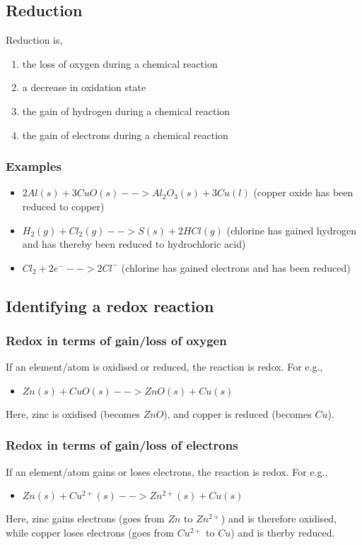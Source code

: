 \documentclass[11pt]{article}
\begin{document}
\subsection{Reduction}
\label{sec:org8f3e18a}
Reduction is,
\begin{enumerate}
\item the loss of oxygen during a chemical reaction
\item a decrease in oxidation state
\item the gain of hydrogen during a chemical reaction
\item the gain of electrons during a chemical reaction
\end{enumerate}
\subsubsection{Examples}
\label{sec:orgc301ad1}
\begin{itemize}
\item \(2Al(s) + 3CuO(s) --> Al_2O_3(s) + 3Cu(l)\) (copper oxide has been reduced to copper)
\item \(H_2(g) + Cl_2(g) --> S(s) + 2HCl(g)\) (chlorine has gained hydrogen and has thereby been reduced to hydrochloric acid)
\item \(Cl_2 + 2e^- --> 2Cl^-\) (chlorine has gained electrons and has been reduced)
\end{itemize}
\subsection{Identifying a redox reaction}
\label{sec:org8d9c686}
\subsubsection{Redox in terms of gain/loss of oxygen}
\label{sec:org8230370}
If an element/atom is oxidised or reduced, the reaction is redox. For e.g.,
\begin{itemize}
\item \(Zn(s)+CuO(s) --> ZnO(s) + Cu(s)\)
\end{itemize}
Here, zinc is oxidised (becomes \(ZnO\)), and copper is reduced (becomes \(Cu\)).
\subsubsection{Redox in terms of gain/loss of electrons}
\label{sec:org7357acc}
If an element/atom gains or loses electrons, the reaction is redox. For e.g.,
\begin{itemize}
\item \(Zn(s)+Cu^{2+}(s) --> Zn^{2+}(s)+Cu(s)\)
\end{itemize}
Here, zinc gains electrons (goes from \(Zn\) to \(Zn^{2+}\)) and is therefore oxidised, while copper loses electrons (goes from \(Cu^{2+}\) to \(Cu\)) and is therby reduced.
\end{document}
